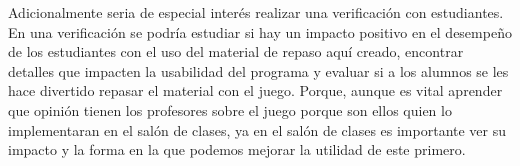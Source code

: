 Adicionalmente seria de especial interés realizar una verificación con estudiantes. En una verificación se podría estudiar si hay un impacto positivo en el desempeño de los estudiantes con el uso del material de repaso aquí creado, encontrar detalles que impacten la usabilidad del programa y evaluar si a los alumnos se les hace divertido repasar el material con el juego. Porque, aunque es vital aprender que opinión tienen los profesores sobre el juego porque son ellos quien lo implementaran en el salón de clases, ya en el salón de clases es importante ver su impacto y la forma en la que podemos mejorar la utilidad de este primero.



